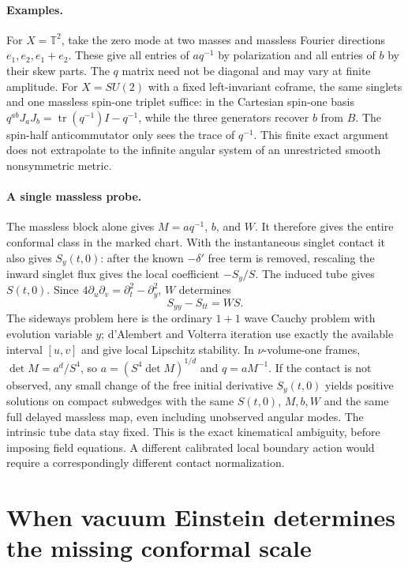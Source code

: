 \documentclass[11pt]{article}
\newcommand{\tr}{\operatorname{tr}}
\begin{document}
\paragraph{Examples.}
For \(X=\mathbb T^2\), take the zero mode at two masses and massless Fourier directions \(e_1,e_2,e_1+e_2\). These give all entries of \(a q^{-1}\) by polarization and all entries of \(b\) by their skew parts. The \(q\) matrix need not be diagonal and may vary at finite amplitude. For \(X=SU(2)\) with a fixed left-invariant coframe, the same singlets and one massless spin-one triplet suffice: in the Cartesian spin-one basis \(q^{ab}J_aJ_b=\tr(q^{-1})I-q^{-1}\), while the three generators recover \(b\) from \(B\). The spin-half anticommutator only sees the trace of \(q^{-1}\). This finite exact argument does not extrapolate to the infinite angular system of an unrestricted smooth nonsymmetric metric.

\paragraph{A single massless probe.}
The massless block alone gives \(M=a q^{-1}\), \(b\), and \(W\). It therefore gives the entire conformal class in the marked chart. With the instantaneous singlet contact it also gives \(S_y(t,0)\): after the known \(-\delta'\) free term is removed, rescaling the inward singlet flux gives the local coefficient \(-S_y/S\). The induced tube gives \(S(t,0)\). Since \(4\partial_u\partial_v=\partial_t^2-\partial_y^2\), \(W\) determines
\[
 S_{yy}-S_{tt}=W S.
\]
The sideways problem here is the ordinary \(1+1\) wave Cauchy problem with evolution variable \(y\); d'Alembert and Volterra iteration use exactly the available interval \([u,v]\) and give local Lipschitz stability. In \(\nu\)-volume-one frames, \(\det M=a^d/S^4\), so \(a=(S^4\det M)^{1/d}\) and \(q=a M^{-1}\). If the contact is not observed, any small change of the free initial derivative \(S_y(t,0)\) yields positive solutions on compact subwedges with the same \(S(t,0)\), \(M,b,W\) and the same full delayed massless map, even including unobserved angular modes. The intrinsic tube data stay fixed. This is the exact kinematical ambiguity, before imposing field equations. A different calibrated local boundary action would require a correspondingly different contact normalization.

\section{When vacuum Einstein determines the missing conformal scale}
\end{document}

